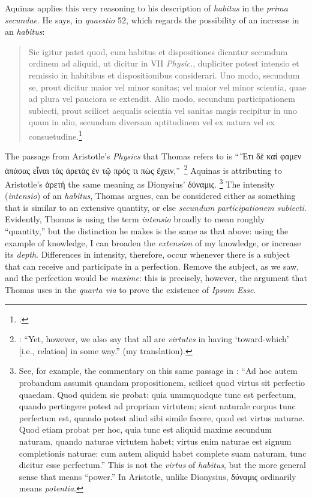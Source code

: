 Aquinas applies this very reasoning to his description of \emph{habitus} in the \emph{prima secundae}. He says, in \emph{quaestio} 52, which regards the possibility of an increase in an \emph{habitus}:
%
\begin{quotation}
Sic igitur patet quod, cum habitus et dispositiones dicantur secundum ordinem ad aliquid, ut dicitur in VII \emph{Physic.}, dupliciter potest intensio et remissio in habitibus et dispositionibus considerari. Uno modo, secundum se, prout dicitur maior vel minor sanitas; vel maior vel minor scientia, quae ad plura vel pauciora se extendit. Alio modo, secundum participationem subiecti, prout scilicet aequalis scientia vel sanitas magis recipitur in uno quam in alio, secundum diversam aptitudinem vel ex natura vel ex consuetudine.\footcite[I-II, q.~53, a.~1, co.]{st:summa}
\end{quotation}
%
The passage from Aristotle’s \emph{Physics} that Thomas refers to is “\,Ἔτι δὲ καί φαμεν ἁπάσας εἶναι τὰς ἀρετὰς ἐν τῷ πρός τι πὼς ἔχειν,”\,%
%
\footnote{\Cite[Η, 3, 246b 3-4]{aristotle:physics}: “Yet, however, we also say that all are \emph{virtutes} in having ‘toward-which’ [i.e., relation] in some way.” (my translation).} Aquinas is attributing to Aristotle’s ἀρετή the same meaning as Dionysius’ δύναμις.%
%
\footnote{See, for example, the commentary on this same passage in \cite[VII, lc.~6, 920]{st:phys}: “Ad hoc autem probandum assumit quandam propositionem, scilicet quod virtus sit perfectio quaedam. Quod quidem sic probat: quia unumquodque tunc est perfectum, quando pertingere potest ad propriam virtutem; sicut naturale corpus tunc perfectum est, quando potest aliud sibi simile facere, quod est virtus naturae. Quod etiam probat per hoc, quia tunc est aliquid maxime secundum naturam, quando naturae virtutem habet; virtus enim naturae est signum completionis naturae: cum autem aliquid habet complete suam naturam, tunc dicitur esse perfectum.”
This is not the \emph{virtus} of \emph{habitus}, but the more general sense that means “power.”  In Aristotle, unlike Dionysius, δύναμις ordinarily means \emph{potentia}.}
%
The intensity (\emph{intensio})  of an \emph{habitus}, Thomas argues, can be considered either as something that is similar to an extensive quantity, or else \emph{secundum participationem subiecti}. Evidently, Thomas is using the term \emph{intensio} broadly to mean roughly “quantity,” but the distinction he makes is the same as that above: using the example of knowledge, I can broaden the \emph{extension} of my knowledge, or increase its \emph{depth}. Differences in intensity, therefore, occur whenever there is a subject that can receive and participate in a perfection. Remove the subject, as we saw, and the perfection would be \emph{maxime}: this is precisely, however, the argument that Thomas uses in the \emph{quarta via} to prove the existence of \emph{Ipsum Esse}.

